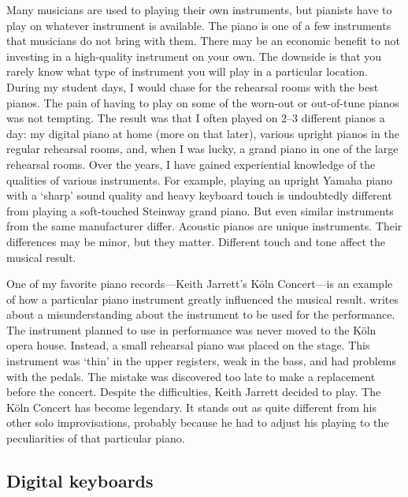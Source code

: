 Many musicians are used to playing their own instruments, but pianists have to play on whatever instrument is available. The piano is one of a few instruments that musicians do not bring with them. There may be an economic benefit to not investing in a high-quality instrument on your own. The downside is that you rarely know what type of instrument you will play in a particular location. During my student days, I would chase for the rehearsal rooms with the best pianos. The pain of having to play on some of the worn-out or out-of-tune pianos was not tempting. The result was that I often played on 2--3 different pianos a day: my digital piano at home (more on that later), various upright pianos in the regular rehearsal rooms, and, when I was lucky, a grand piano in one of the large rehearsal rooms. Over the years, I have gained experiential knowledge of the qualities of various instruments. For example, playing an upright Yamaha piano with a `sharp' sound quality and heavy keyboard touch is undoubtedly different from playing a soft-touched Steinway grand piano. But even similar instruments from the same manufacturer differ. Acoustic pianos are unique instruments. Their differences may be minor, but they matter. Different touch and tone affect the musical result.

One of my favorite piano records---Keith Jarrett's Köln Concert---is an example of how a particular piano instrument greatly influenced the musical result. \citet{carr_keith_1992} writes about a misunderstanding about the instrument to be used for the performance. The instrument planned to use in performance was never moved to the Köln opera house. Instead, a small rehearsal piano was placed on the stage. This instrument was `thin' in the upper registers, weak in the bass, and had problems with the pedals. The mistake was discovered too late to make a replacement before the concert. Despite the difficulties, Keith Jarrett decided to play. The Köln Concert has become legendary. It stands out as quite different from his other solo improvisations, probably because he had to adjust his playing to the peculiarities of that particular piano.


\subsection{Digital keyboards}

